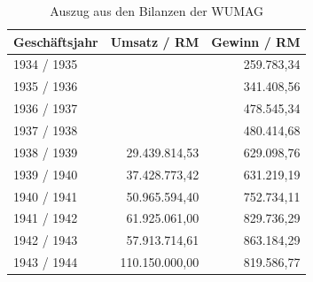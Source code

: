 \documentclass[a4paper,12pt,ngerman,
]{nisebook}
\begin{document}
\begin{table}
\centering
\begin{tabularx}{.6\textwidth}{Xrr}
\hline
\textbf{Geschäftsjahr} & \textbf{Umsatz / RM} & \textbf{Gewinn / RM}\\
\hline
1934 / 1935 & & 259.783,34\\
1935 / 1936 & & 341.408,56\\
1936 / 1937 & & 478.545,34\\
1937 / 1938 & & 480.414,68\\
1938 / 1939 & 29.439.814,53 & 629.098,76\\
1939 / 1940 & 37.428.773,42 & 631.219,19\\
1940 / 1941 & 50.965.594,40 & 752.734,11\\
1941 / 1942 & 61.925.061,00 & 829.736,29\\
1942 / 1943 & 57.913.714,61 & 863.184,29\\
1943 / 1944 & 110.150.000,00 & 819.586,77\\
\hline
\end{tabularx}
\caption{Auszug aus den Bilanzen der WUMAG\label{umsaetze}}
\end{table}
\end{document}
